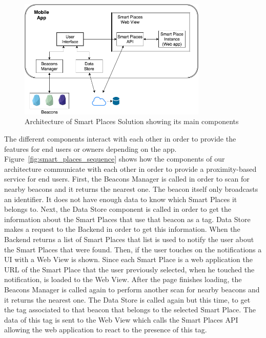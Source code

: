\begin{figure}[!ht]
  \centering
    \includegraphics[width=0.8\textwidth, keepaspectratio]{images/smart_places_architecture}
    \caption[Smart Places Solution Architecture]{Architecture of Smart Places Solution showing its main components}
    \label{fig:smart_places_architecture}
\end{figure}

The different components interact with each other in order to provide the features for end users or owners depending on the app.
Figure~\ref{fig:smart_places_sequence} shows how the components of our architecture communicate with each other in order to provide a proximity-based service for end users.
First, the Beacons Manager is called in order to scan for nearby beacons and it returns the nearest one.
The beacon itself only broadcasts an identifier.
It does not have enough data to know which Smart Places it belongs to.
Next, the Data Store component is called in order to get the information about the Smart Places that use that beacon as a tag.
Data Store makes a request to the Backend in order to get this information.
When the Backend returns a list of Smart Places that list is used to notify the user about the Smart Places that were found.
Then, if the user touches on the notifications a \gls{UI} with a Web View is shown.
Since each Smart Place is a web application the \gls{URL} of the Smart Place that the user previously selected, when he touched the notification, is loaded to the Web View.
After the page finishes loading, the Beacons Manager is called again to perform another scan for nearby beacons and it returns the nearest one.
The Data Store is called again but this time, to get the tag associated to that beacon that belongs to the selected Smart Place.
The data of this tag is sent to the Web View which calls the Smart Places \gls{API} allowing the web application to react to the presence of this tag.

